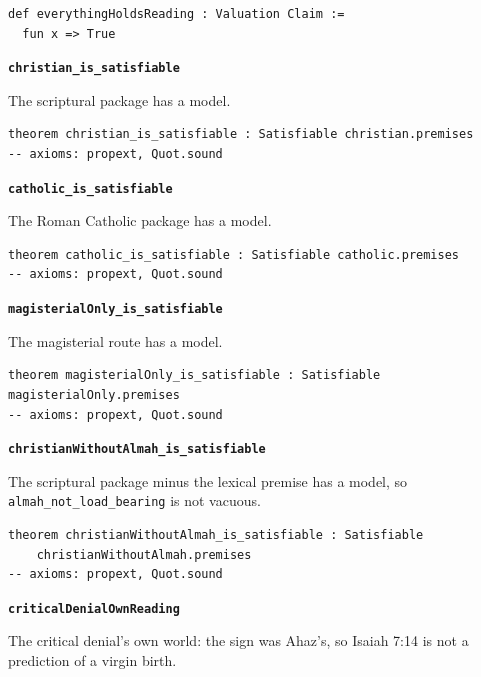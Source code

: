 \documentclass[11pt]{article}
\begin{document}
{\small\begin{verbatim}
def everythingHoldsReading : Valuation Claim :=
  fun x => True
\end{verbatim}}
\par\medskip\noindent\textbf{\texttt{christian\_\allowbreak{}is\_\allowbreak{}satisfiable}}\par\nobreak\noindent
The scriptural package has a model.

{\small\begin{verbatim}
theorem christian_is_satisfiable : Satisfiable christian.premises
-- axioms: propext, Quot.sound
\end{verbatim}}
\par\medskip\noindent\textbf{\texttt{catholic\_\allowbreak{}is\_\allowbreak{}satisfiable}}\par\nobreak\noindent
The Roman Catholic package has a model.

{\small\begin{verbatim}
theorem catholic_is_satisfiable : Satisfiable catholic.premises
-- axioms: propext, Quot.sound
\end{verbatim}}
\par\medskip\noindent\textbf{\texttt{magisterial\allowbreak{}Only\_\allowbreak{}is\_\allowbreak{}satisfiable}}\par\nobreak\noindent
The magisterial route has a model.

{\small\begin{verbatim}
theorem magisterialOnly_is_satisfiable : Satisfiable magisterialOnly.premises
-- axioms: propext, Quot.sound
\end{verbatim}}
\par\medskip\noindent\textbf{\texttt{christian\allowbreak{}Without\allowbreak{}Almah\_\allowbreak{}is\_\allowbreak{}satisfiable}}\par\nobreak\noindent
The scriptural package minus the lexical premise has a model, so \texttt{almah\_\allowbreak{}not\_\allowbreak{}load\_\allowbreak{}bearing} is not vacuous.

{\small\begin{verbatim}
theorem christianWithoutAlmah_is_satisfiable : Satisfiable
    christianWithoutAlmah.premises
-- axioms: propext, Quot.sound
\end{verbatim}}
\par\medskip\noindent\textbf{\texttt{critical\allowbreak{}Denial\allowbreak{}Own\allowbreak{}Reading}}\par\nobreak\noindent
The critical denial’s own world: the sign was Ahaz’s, so Isaiah 7:14 is not a prediction of a virgin birth.
\end{document}
